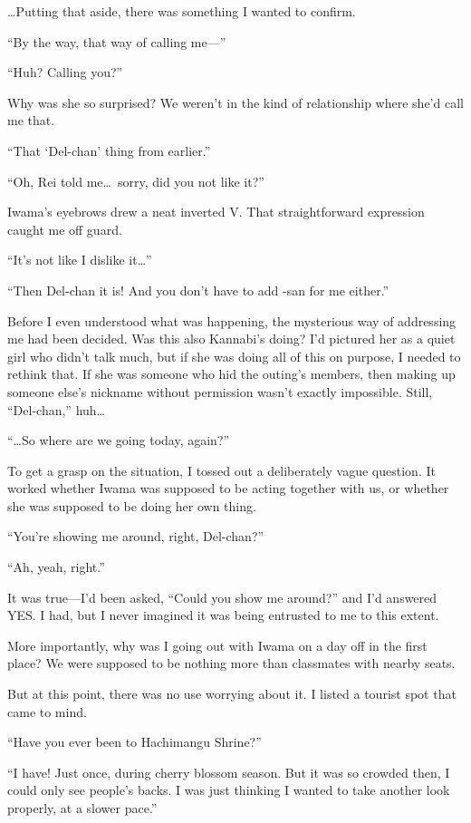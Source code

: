 \documentclass[
    a4paper,
    12pt,
    twoside,
    openany,
    UTF8,
    fontset=windows
]{ctexbook}
\begin{document}
\dots Putting that aside, there was something I wanted to confirm.

``By the way, that way of calling me---''

``Huh? Calling you?''

Why was she so surprised? We weren't in the kind of relationship where she'd call me that.

``That `Del-chan' thing from earlier.''

``Oh, Rei told me\dots\ sorry, did you not like it?''

Iwama's eyebrows drew a neat inverted V. That straightforward expression caught me off guard.

``It's not like I dislike it\dots''

``Then Del-chan it is! And you don't have to add -san for me either.''

Before I even understood what was happening, the mysterious way of addressing me had been decided. Was this also Kannabi's doing? I'd pictured her as a quiet girl who didn't talk much, but if she was doing all of this on purpose, I needed to rethink that. If she was someone who hid the outing's members, then making up someone else's nickname without permission wasn't exactly impossible. Still, ``Del-chan,'' huh\dots

``\dots So where are we going today, again?''

To get a grasp on the situation, I tossed out a deliberately vague question. It worked whether Iwama was supposed to be acting together with us, or whether she was supposed to be doing her own thing.

``You're showing me around, right, Del-chan?''

``Ah, yeah, right.''

It was true---I'd been asked, ``Could you show me around?'' and I'd answered YES. I had, but I never imagined it was being entrusted to me to this extent.

More importantly, why was I going out with Iwama on a day off in the first place? We were supposed to be nothing more than classmates with nearby seats.

But at this point, there was no use worrying about it. I listed a tourist spot that came to mind.

``Have you ever been to Hachimangu Shrine?''

``I have! Just once, during cherry blossom season. But it was so crowded then, I could only see people's backs. I was just thinking I wanted to take another look properly, at a slower pace.''
\end{document}
